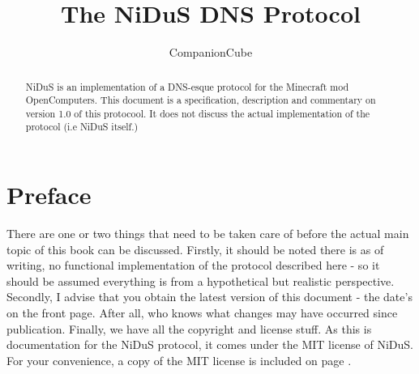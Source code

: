 \documentclass[]{report}
\title{The NiDuS DNS Protocol}
\author{CompanionCube}
\begin{document}
\maketitle

\begin{abstract}
NiDuS is an implementation of a DNS-esque protocol for the Minecraft mod OpenComputers. This document is a specification, description and commentary on version 1.0 of this protocool. It does not discuss the actual implementation of the protocol (i.e NiDuS itself.)
\end{abstract}

\chapter*{Preface}
There are one or two things that need to be taken care of before the actual main topic of this book can be discussed. Firstly, it should be noted there is as of writing, no functional implementation of the protocol described here - so it should be assumed everything is from a hypothetical but realistic perspective. Secondly, I advise that you obtain the latest version of this document - the date's on the front page. After all, who knows what changes may have occurred since publication. Finally, we have all the copyright and license stuff. As this is documentation for the NiDuS protocol, it comes under the MIT license of NiDuS. For your convenience, a copy of the MIT license is included on page \pageref{mit}.
\end{document}
